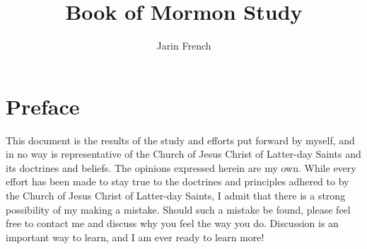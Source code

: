 \documentclass[12pt]{report}
\author{Jarin French}
\title{Book of Mormon Study}
\begin{document}
\maketitle
\chapter*{Preface}
This document is the results of the study and efforts put forward by myself, and in no way is representative of the Church of Jesus Christ of Latter-day Saints and its doctrines and beliefs.  The opinions expressed herein are my own.  While every effort has been made to stay true to the doctrines and principles adhered to by the Church of Jesus Christ of Latter-day Saints, I admit that there is a strong possibility of my making a mistake.  Should such a mistake be found, please feel free to contact me and discuss why you feel the way you do.  Discussion is an important way to learn, and I am ever ready to learn more!
\end{document}

